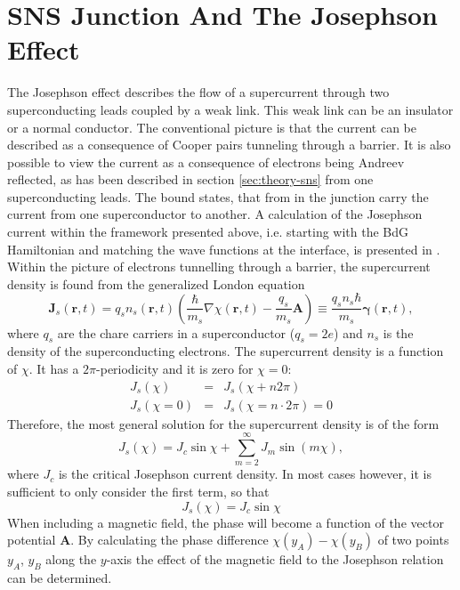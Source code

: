\section{SNS Junction And The Josephson Effect}
The Josephson effect \cite{Josephson1962} describes the flow of a supercurrent through two superconducting leads coupled by a weak link. This weak link can be an insulator or a normal conductor. The conventional picture is that the current can be described as a consequence of Cooper pairs tunneling through a barrier. It is also possible to view the current as a consequence of electrons being Andreev reflected, as has been described in section \ref{sec:theory-sns} from one superconducting leads. The bound states, that from in the junction carry the current from one superconductor to another. A calculation of the Josephson current within the framework presented above, i.e. starting with the BdG Hamiltonian and matching the wave functions at the interface, is presented in \cite{Furusaki1999}.
Within the picture of electrons tunnelling through a barrier, the supercurrent density is found from the generalized London equation
\begin{equation}
\mathbf{J}_s ( \mathbf{r}, t ) = q_s n_s (\mathbf{r}, t ) \left( \frac{\hbar}{m_s} \nabla \chi (\mathbf{r}, t ) - \frac{q_s}{m_s} \mathbf{A} \right) \equiv \frac{q_s n_s \hbar}{m_s} \mathbf{\gamma} (\mathbf{r}, t ),\label{eq:current-density-general}
\end{equation}
where $q_s$ are the chare carriers in a superconductor ($q_s = 2e$) and $n_s$ is the density of the superconducting electrons. The supercurrent density is a function of $\chi$. It has a $2 \pi$-periodicity and it is zero for $\chi = 0$:
\begin{eqnarray}
J_s ( \chi)  &=& J_s ( \chi  + n 2 \pi) \\
J_s ( \chi = 0 ) &=& J_s ( \chi = n \cdot 2\pi) = 0
\end{eqnarray}
Therefore, the most general solution for the supercurrent density is of the form
\begin{equation}
J_s (\chi) = J_c \sin \chi + \sum_{m=2}^{\infty} J_m \sin(m \chi),
\end{equation}
where $J_c$ is the critical Josephson current density. In most cases however, it is sufficient to only consider the first term, so that
\begin{equation}
J_s ( \chi ) = J_c \sin \chi
\end{equation}
When including a magnetic field, the phase will become a function of the vector potential $\mathbf{A}$. By calculating the phase difference $\chi(y_A) - \chi (y_B)$ of two points $y_A$, $y_B$ along the $y$-axis the effect of the magnetic field to the Josephson relation can be determined.
